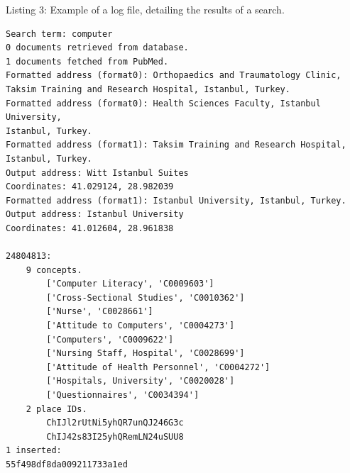 \documentclass[Report.tex]{subfiles}
\begin{document}
\noindent Listing 3: Example of a log file, detailing the results of a search.
\begin{verbatim}
Search term: computer
0 documents retrieved from database.
1 documents fetched from PubMed.
Formatted address (format0): Orthopaedics and Traumatology Clinic, 
Taksim Training and Research Hospital, Istanbul, Turkey.
Formatted address (format0): Health Sciences Faculty, Istanbul University, 
Istanbul, Turkey.
Formatted address (format1): Taksim Training and Research Hospital, 
Istanbul, Turkey.
Output address: Witt Istanbul Suites
Coordinates: 41.029124, 28.982039
Formatted address (format1): Istanbul University, Istanbul, Turkey.
Output address: Istanbul University
Coordinates: 41.012604, 28.961838

24804813:
	9 concepts.
		['Computer Literacy', 'C0009603']
		['Cross-Sectional Studies', 'C0010362']
		['Nurse', 'C0028661']
		['Attitude to Computers', 'C0004273']
		['Computers', 'C0009622']
		['Nursing Staff, Hospital', 'C0028699']
		['Attitude of Health Personnel', 'C0004272']
		['Hospitals, University', 'C0020028']
		['Questionnaires', 'C0034394']
	2 place IDs.
		ChIJl2rUtNi5yhQR7unQJ246G3c
		ChIJ42s83I25yhQRemLN24uSUU8
1 inserted:
55f498df8da009211733a1ed
\end{verbatim}\\
\end{document}
